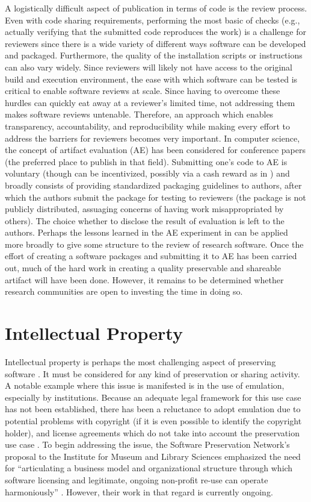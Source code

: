 \documentclass[letterpaper,11pt]{article}
\begin{document}
A logistically difficult aspect of publication in terms of code is the review process. Even with code sharing requirements, performing the most basic of checks (e.g., actually verifying that the submitted code reproduces the work) is a challenge for reviewers since there is a wide variety of different ways software can be developed and packaged. Furthermore, the quality of the installation scripts or instructions can also vary widely. Since reviewers will likely not have access to the original build and execution environment, the ease with which software can be tested is critical to enable software reviews at scale. Since having to overcome these hurdles can quickly eat away at a reviewer’s limited time, not addressing them makes software reviews untenable. Therefore, an approach which enables transparency, accountability, and reproducibility while making every effort to address the barriers for reviewers becomes very important. In computer science, the concept of artifact evaluation (AE) \citep{krishnamurthi2013} has been considered for conference papers (the preferred place to publish in that field). Submitting one’s code to AE is voluntary (though can be incentivized, possibly via a cash reward as in \citep{krishnamurthi2013})  and broadly consists of providing standardized packaging guidelines to authors, after which the authors submit the package for testing to reviewers (the package is not publicly distributed, assuaging concerns of having work misappropriated by others). The choice whether to disclose the result of evaluation is left to the authors. Perhaps the lessons learned in the AE experiment in \citep{krishnamurthi2013} can be applied more broadly to give some structure to the review of research software. Once the effort of creating a software packages and submitting it to AE has been carried out, much of the hard work in creating a quality preservable and shareable artifact will have been done. However, it remains to be determined whether research communities are open to investing the time in doing so.

\section{Intellectual Property}
Intellectual property is perhaps the most challenging aspect of preserving software \citep{lowood2013,mcdonough2010,cochrane2014}. It must be considered for any kind of preservation or sharing activity. A notable example where this issue is manifested is in the use of emulation, especially by institutions. Because an adequate legal framework for this use case has not been established, there has been a reluctance to adopt emulation due to potential problems with copyright (if it is even possible to identify the copyright holder), and license agreements which do not take into account the preservation use case \citep{rosenthal2015}. To begin addressing the issue, the Software Preservation Network's proposal to the Institute for Museum and Library Sciences emphasized the need for ``articulating a business model and organizational structure through which software licensing and legitimate, ongoing non-profit re-use can operate harmoniously'' \citep{vowell2015}. However, their work in that regard is currently ongoing.
\end{document}
